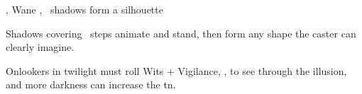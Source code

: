  {\mFire, \mAir}%
  {Wane}%
  {\detailed, \duplicated}%
  {}%
  {\spellArea\ shadows form a silhouette}%
  {
    Shadows covering \spellArea\ steps animate and stand, then form any shape the caster can clearly imagine.

    \setcounter{track}{\value{spelllevel}}
    \addtocounter{track}{7}
    Onlookers in twilight must roll Wits + Vigilance, , to see through the illusion, and more darkness can increase the \gls{tn}.
  }

